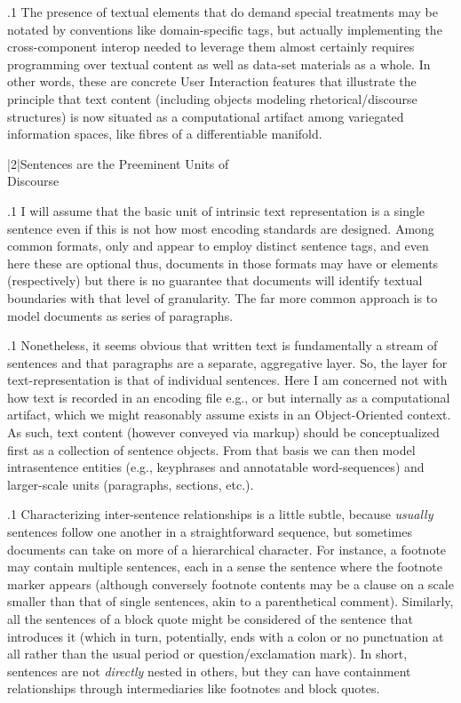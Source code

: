 \documentclass[11pt, twocolumn]{article}
\begin{document}
\p.1{%
The presence of textual elements that do demand special
treatments may be notated by conventions like
domain-specific  tags, but actually implementing
the cross-component interop needed to leverage them
almost certainly requires programming over
textual content as well as data-set materials as a whole.
In other words, these are concrete User Interaction
features that illustrate the principle that
text content (including objects modeling rhetorical/discourse
structures) is now situated as a computational
artifact among variegated information spaces,
like fibres of a differentiable manifold.
}%


\s|2|{Sentences are the Preeminent Units of\\Discourse}

\p.1{%
I will assume that the basic unit of intrinsic
text representation is a single sentence \mdash{} even
if this is not how most encoding standards
are designed. Among common formats, only  and
 appear to employ distinct sentence tags, and
even here these are optional \mdash{} thus, documents
in those formats may
have  or  elements (respectively) but there is no
guarantee that documents will identify textual
boundaries with that level of granularity. The far
more common approach is to model documents
as series of paragraphs.
}%

\p.1{%
Nonetheless, it seems obvious that written
text is fundamentally a stream of sentences
and that paragraphs are a separate, aggregative
layer. So, the  layer for text-representation
is that of individual sentences. Here I
am concerned not with how text is recorded in an
encoding file \mdash{} e.g.,  or  \mdash{} but internally
as a computational artifact, which we might reasonably
assume exists in an Object-Oriented context.
As such, text content (however conveyed via markup)
should be conceptualized first as a collection of
sentence objects. From that basis we can then
model intrasentence entities (e.g., keyphrases
and annotatable word-sequences) and larger-scale
units (paragraphs, sections, etc.).
}%

\p.1{%
Characterizing inter-sentence relationships is a little
subtle, because \textit{usually} sentences follow one another
in a straightforward sequence, but sometimes documents
can take on more of a hierarchical character. For instance,
a footnote may contain multiple sentences, each in a
sense  the sentence where the footnote
marker appears (although conversely footnote contents
may be a clause on a scale smaller than that of
single sentences, akin to a parenthetical comment). Similarly,
all the sentences of a block quote might be considered
 of the sentence that introduces it
(which in turn, potentially, ends with a colon \mdash{} or
no punctuation at all \mdash{} rather than the usual
period or question/exclamation mark). In short, sentences
are not \textit{directly} nested in others, but they can
have containment relationships through intermediaries
like footnotes and block quotes.
}%
\end{document}
